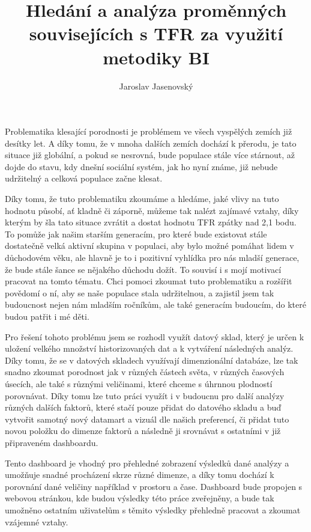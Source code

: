 \documentclass[thesis=M,czech]{FITthesis}[2022/10/08]
\title{Hledání a analýza proměnných souvisejících s TFR za využití metodiky BI}
\author{Jaroslav Jasenovský} %
\begin{document}

\begin{introduction}
Problematika klesající porodnosti je problémem ve všech vyspělých zemích již desítky let. A díky tomu, že v mnoha dalších zemích dochází k přerodu, je tato situace již globální, a pokud se nesrovná, bude populace stále více stárnout, až dojde do stavu, kdy dnešní sociální systém, jak ho nyní známe, již nebude udržitelný a celková populace začne klesat.

Díky tomu, že tuto problematiku zkoumáme a hledáme, jaké vlivy na tuto hodnotu působí, ať kladně či záporně, můžeme tak nalézt zajímavé vztahy, díky kterým by šla tato situace zvrátit a dostat hodnotu TFR zpátky nad 2,1 bodu. To pomůže jak našim starším generacím, pro které bude existovat stále dostatečně velká aktivní skupina v populaci, aby bylo možné pomáhat lidem v důchodovém věku, ale hlavně je to i pozitivní vyhlídka pro nás mladší generace, že bude stále šance se nějakého důchodu dožít. To souvisí i s mojí motivací pracovat na tomto tématu. Chci pomoci zkoumat tuto problematiku a rozšířit povědomí o ní, aby se naše populace stala udržitelnou, a zajistil jsem tak budoucnost nejen nám mladším ročníkům, ale také generacím budoucím, do které budou patřit i mé děti.  

Pro řešení tohoto problému jsem se rozhodl využít datový sklad, který je určen k uložení velkého množství historizovaných dat a k vytváření následných analýz. Díky tomu, že se v datových skladech využívají dimenzionální databáze, lze tak snadno zkoumat porodnost jak v různých částech světa, v různých časových úsecích, ale také s různými veličinami, které chceme s úhrnnou plodností porovnávat. Díky tomu lze tuto práci využít i v budoucnu pro další analýzy různých dalších faktorů, které stačí pouze přidat do datového skladu a buď vytvořit samotný nový datamart a vizuál dle našich preferencí, či přidat tuto novou položku do dimenze faktorů a následně ji srovnávat s ostatními v již připraveném dashboardu.

Tento dashboard je vhodný pro přehledné zobrazení výsledků dané analýzy a umožňuje snadné procházení skrze různé dimenze, a díky tomu dochází k porovnání dané veličiny například v prostoru a čase. Dashboard bude propojen s webovou stránkou, kde budou výsledky této práce zveřejněny, a bude tak umožněno ostatním uživatelům s těmito výsledky přehledně pracovat a zkoumat vzájemné vztahy.

\end{introduction}
\end{document}
